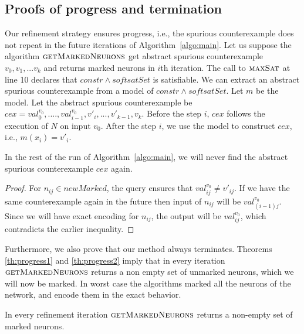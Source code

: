 \subsection{Proofs of progress and termination}

Our refinement strategy ensures progress, i.e., the spurious counterexample does not
repeat in the future
iterations of Algorithm~\ref{algo:main}. Let us suppose the algorithm
$\textsc{getMarkedNeurons}$ get abstract spurious counterexample
${v_0}, {v_1}, ... {v_k}$ and
returns marked neurons in $i$th iteration.
The call to $\textsc{maxSat}{}$ at line 10
declares that $constr \land softsatSet$ is satisfiable.
We can extract an abstract spurious counterexample from a model
of $constr \land softsatSet$.
Let $m$ be the model.
Let the abstract spurious counterexample be $cex = val_0^{v_0}, ...., val^{v_0}_{i-1},v'_{i},...,v'_{k-1},v_k$.
Before the step $i$, $cex$ follows the execution of $N$ on input $v_0$.
After the step $i$, we use the model to construct $cex$, i.e., $m(x_i) = v'_i$.

\begin{theorem}
  In the rest of the run of Algorithm~\ref{algo:main}, we will never find the abstract
  spurious counterexample
  $cex$ again.
\end{theorem}
\begin{proof}
  For $n_{ij} \in newMarked$, the \maxsat{} query ensures that
  $val^{v_0}_{ij} \neq v'_{ij}$.
  If we have the same counterexample again in the future then
  input of $n_{ij}$ will be $val^{v_0}_{(i-1)j}$.
  Since we will have exact encoding for $n_{ij}$, the output
  will be $val^{v_0}_{ij}$, which contradicts the earlier inequality.  
\end{proof}

Furthermore, we also prove that our method always terminates.
%
Theorems \ref{th:progress1} and \ref{th:progress2} imply that in every
iteration $\textsc{getMarkedNeurons}$
returns a non empty set of unmarked neurons, which we will now be marked. In worst case the algorithms marked all 
the neurons of the network, and encode them in the exact behavior. 





\begin{theorem}
  \label{th:progress1}
  In every refinement iteration $\textsc{getMarkedNeurons}$
  returns a non-empty set of marked neurons. 
\end{theorem}

